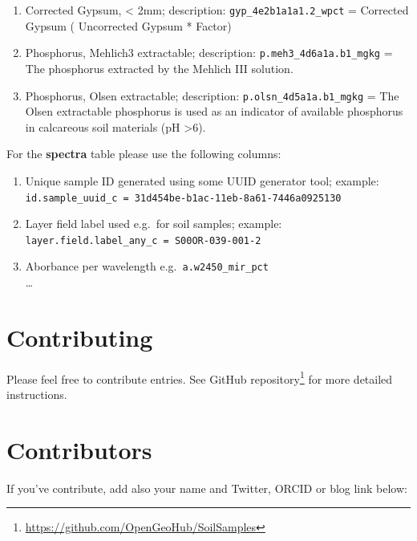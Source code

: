 \documentclass[
  graybox,natbib,nospthms]{svmono}
\providecommand{\tightlist}{%
  \setlength{\itemsep}{0pt}\setlength{\parskip}{0pt}}
\providecommand{\tightlist}{\setlength{\itemsep}{0pt}\setlength{\parskip}{0pt}}
\renewcommand{\href}[2]{#2 (\url{#1})}
\renewcommand{\href}[2]{#2\footnote{\url{#1}}}
\begin{document}
\begin{enumerate}
\item
  Corrected Gypsum, \textless{} 2mm; description: \texttt{gyp\_4e2b1a1a1.2\_wpct} = Corrected Gypsum ( Uncorrected Gypsum * Factor)\\
\item
  Phosphorus, Mehlich3 extractable; description: \texttt{p.meh3\_4d6a1a.b1\_mgkg} = The phosphorus extracted by the Mehlich III solution.\\
\item
  Phosphorus, Olsen extractable; description: \texttt{p.olsn\_4d5a1a.b1\_mgkg} = The Olsen extractable phosphorus is used as an indicator of available phosphorus in calcareous soil materials (pH \textgreater6).
\end{enumerate}

For the \textbf{spectra} table please use the following columns:

\begin{enumerate}
\def\labelenumi{\arabic{enumi}.}
\tightlist
\item
  Unique sample ID generated using some UUID generator tool; example: \texttt{id.sample\_uuid\_c\ =\ \textquotesingle{}31d454be-b1ac-11eb-8a61-7446a0925130\textquotesingle{}}\\
\item
  Layer field label used e.g.~for soil samples; example: \texttt{layer.field.label\_any\_c\ =\ \textquotesingle{}S00OR-039-001-2\textquotesingle{}}\\
\item
  Aborbance per wavelength e.g.~\texttt{a.w2450\_mir\_pct}\\
  \ldots{}\\
\end{enumerate}

\hypertarget{contributing}{%
\section{Contributing}\label{contributing}}

Please feel free to contribute entries. See \href{https://github.com/OpenGeoHub/SoilSamples}{GitHub
repository} for more detailed
instructions.

\hypertarget{contributors}{%
\section{Contributors}\label{contributors}}

If you've contribute, add also your name and Twitter, ORCID or blog link
below:
\end{document}
